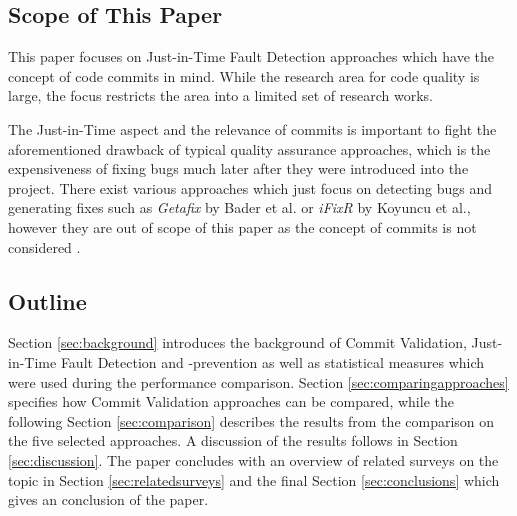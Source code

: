 \subsection{Scope of This Paper}
\label{sec:scope}


This paper focuses on Just-in-Time Fault Detection approaches which have the concept of code commits in mind. 
While the research area for code quality is large, the focus restricts the area into a limited set of research works.

The Just-in-Time aspect and the relevance of commits is important to fight the aforementioned drawback of typical quality assurance approaches, which is the expensiveness of fixing bugs much later after they were introduced into the project. 
There exist various approaches which just focus on detecting bugs and generating fixes such as \textit{Getafix} by Bader et al. or \textit{iFixR} by Koyuncu et al., however they are out of scope of this paper as the concept of commits is not considered \cite{Bader2019,Koyuncu2019}.


\subsection{Outline}
Section \ref{sec:background} introduces the background of Commit Validation, Just-in-Time Fault Detection and -prevention as well as statistical measures which were used during the performance comparison.
Section \ref{sec:comparingapproaches} specifies how Commit Validation approaches can be compared, while the following Section \ref{sec:comparison} describes the results from the comparison on the five selected approaches. A discussion of the results follows in Section \ref{sec:discussion}.
The paper concludes with an overview of related surveys on the topic in Section \ref{sec:relatedsurveys} and the final Section \ref{sec:conclusions} which gives an conclusion of the paper.

